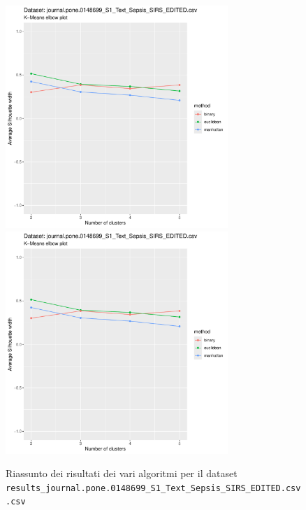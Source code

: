 \documentclass[12pt]{report}
\begin{document}
			\begin{figure}[h]
				\centering
				\includegraphics[width = 0.75\textwidth, height = 0.45\textheight, page = 9]{
					results/results_journal.pone.0148699_S1_Text_Sepsis_SIRS_EDITED.csv.pdf
				}
				\includegraphics[width = 0.75\textwidth, height = 0.45\textheight, page = 10]{
					results/results_journal.pone.0148699_S1_Text_Sepsis_SIRS_EDITED.csv.pdf
				}
				\caption{Riassunto dei risultati dei vari algoritmi per il dataset
				\texttt{results\_journal.pone.0148699\_S1\_Text\_Sepsis\_SIRS\_EDITED.csv.csv}}
				\label{fig:comp5}
			\end{figure}
\end{document}
